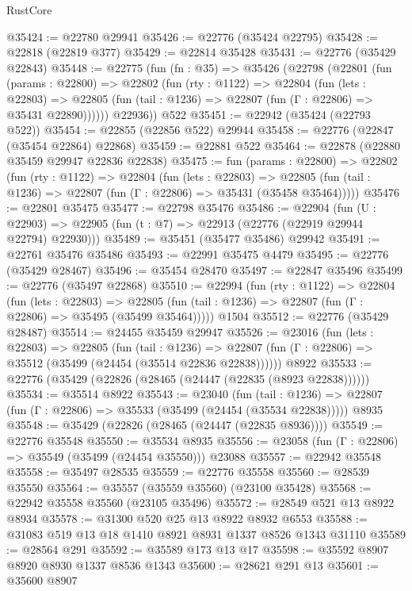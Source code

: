 \begin{lexlean}{RustCore}
\begin{coremodule}
@35424 := @22780 @29941
@35426 := @22776 (@35424 @22795)
@35428 := @22818 (@22819 @377)
@35429 := @22814 @35428
@35431 := @22776 (@35429 @22843)
@35448 := @22775
    (fun (fn : @35) =>
    @35426
      (@22798
        (@22801
          (fun (params : @22800) =>
          @22802
            (fun (rty : @1122) =>
            @22804
              (fun (lets : @22803) =>
              @22805 (fun (tail : @1236) => @22807 (fun (Γ : @22806) => @35431 @22890))))))
        @22936))
    @522
@35451 := @22942 (@35424 (@22793 @522))
@35454 := @22855 (@22856 @522) @29944
@35458 := @22776 (@22847 (@35454 @22864) @22868)
@35459 := @22881 @522
@35464 := @22878 (@22880 @35459 @29947 @22836 @22838)
@35475 := fun (params : @22800) =>
  @22802
    (fun (rty : @1122) =>
    @22804
      (fun (lets : @22803) =>
      @22805 (fun (tail : @1236) => @22807 (fun (Γ : @22806) => @35431 (@35458 @35464)))))
@35476 := @22801 @35475
@35477 := @22798 @35476
@35486 := @22904
    (fun (U : @22903) => @22905 (fun (t : @7) => @22913 (@22776 (@22919 @29944 @22794) @22930)))
@35489 := @35451 (@35477 @35486) @29942
@35491 := @22761 @35476 @35486
@35493 := @22991 @35475 @4479
@35495 := @22776 (@35429 @28467)
@35496 := @35454 @28470
@35497 := @22847 @35496
@35499 := @22776 (@35497 @22868)
@35510 := @22994
    (fun (rty : @1122) =>
    @22804
      (fun (lets : @22803) =>
      @22805 (fun (tail : @1236) => @22807 (fun (Γ : @22806) => @35495 (@35499 @35464)))))
    @1504
@35512 := @22776 (@35429 @28487)
@35514 := @24455 @35459 @29947
@35526 := @23016
    (fun (lets : @22803) =>
    @22805
      (fun (tail : @1236) =>
      @22807 (fun (Γ : @22806) => @35512 (@35499 (@24454 (@35514 @22836 @22838))))))
    @8922
@35533 := @22776 (@35429 (@22826 (@28465 (@24447 (@22835 (@8923 @22838))))))
@35534 := @35514 @8922
@35543 := @23040
    (fun (tail : @1236) => @22807 (fun (Γ : @22806) => @35533 (@35499 (@24454 (@35534 @22838)))))
    @8935
@35548 := @35429 (@22826 (@28465 (@24447 (@22835 @8936))))
@35549 := @22776 @35548
@35550 := @35534 @8935
@35556 := @23058 (fun (Γ : @22806) => @35549 (@35499 (@24454 @35550))) @23088
@35557 := @22942 @35548
@35558 := @35497 @28535
@35559 := @22776 @35558
@35560 := @28539 @35550
@35564 := @35557 (@35559 @35560) (@23100 @35428)
@35568 := @22942 @35558 @35560 (@23105 @35496)
@35572 := @28549 @521 @13 @8922 @8934
@35578 := @31300 @520 @25 @13 @8922 @8932 @6553
@35588 := @31083 @519 @13 @18 @1410 @8921 @8931 @1337 @8526 @1343 @31110
@35589 := @28564 @291
@35592 := @35589 @173 @13 @17
@35598 := @35592 @8907 @8920 @8930 @1337 @8536 @1343
@35600 := @28621 @291 @13
@35601 := @35600 @8907

\end{coremodule}
\end{lexlean}
